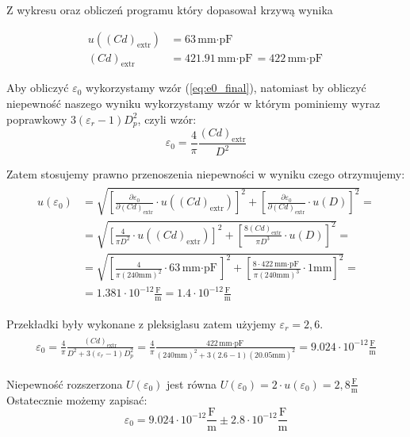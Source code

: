 \documentclass{fizykalab}
\newcommand{\mm}{\ensuremath{\text{mm}}}
\newcommand{\cde}{\ensuremath{(Cd)_\text{extr}}}
\newcommand{\mmpF}{\ensuremath{\text{mm}\cdot\text{pF}}}
\newcommand{\Fm}{\ensuremath{\frac{\text{F}}{\text{m}}}}
\begin{document}
Z wykresu oraz obliczeń programu który dopasował krzywą wynika

\begin{align}
    u(\cde) &= 63 \mmpF \\
    \cde &= 421.91 \mmpF = 422 \mmpF
\end{align}

Aby obliczyć $\varepsilon_0$ wykorzystamy wzór (\ref{eq:e0_final}),
natomiast by obliczyć niepewność naszego wyniku wykorzystamy wzór w którym 
pominiemy wyraz poprawkowy $3(\varepsilon_r - 1) D_p^2$, czyli 
wzór:
\begin{equation*}
    \varepsilon_0 = \frac{4}{\pi} \frac{\cde}{D^2}
\end{equation*}

Zatem stosujemy prawno przenoszenia niepewności w wyniku czego otrzymujemy:
\begin{align}
\begin{split}
    u(\varepsilon_0) &= \sqrt{
        \left[ \frac{\partial \varepsilon_0}{\partial \cde} \cdot u(\cde) \right]^2 + 
        \left[ \frac{\partial \varepsilon_0}{\partial \cde} \cdot u(D)\right]^2
    } =\\ &=
    \sqrt{ 
         \left[ \frac{4}{\pi D^2} \cdot u(\cde) \right]^2+
         \left[ \frac{8 \cde}{\pi D^3} \cdot u(D) \right]^2
    } = \\ &=
    \sqrt {
         \left[ \frac{4}{\pi (240 \mm)^2} \cdot 63 \mmpF \right]^2 +
         \left[ \frac{8 \cdot422\mmpF}{\pi (240 \mm)^3} \cdot 1\mm \right]^2 
    } = \\ &= 1.381 \cdot 10^{-12} \Fm =  1.4 \cdot 10^{-12} \Fm
\end{split}
\end{align}

Przekładki były wykonane z pleksiglasu zatem użyjemy $\varepsilon_r = 2,6$.
\begin{align}
\begin{split}
    \varepsilon_0 = \frac{4}{\pi}
                    \frac{\cde}{D^2 + 3(\varepsilon_r -1) D_p^2} = 
                    \frac{4}{\pi}
                    \frac{422 \mmpF}{(240 \mm)^2 + 3(2.6 -1) (20.05 \mm)^2} = 9.024 \cdot 10^{-12}\Fm
\end{split}
\end{align}

Niepewność rozszerzona $U(\varepsilon_0)$ jest równa $U(\varepsilon_0) = 2\cdot u(\varepsilon_0) = 2,8 \Fm$
Ostatecznie możemy zapisać:
\begin{equation}
    \varepsilon_0 = 9.024 \cdot 10^{-12} \Fm \pm 2.8 \cdot 10^{-12} \Fm
\end{equation}
\end{document}
